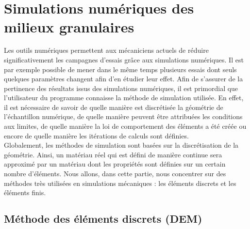 \section{Simulations numériques des milieux granulaires}\label{para:methodes_simu}
	Les outils numériques permettent aux mécaniciens actuels de réduire significativement les campagnes d'essais grâce aux simulations numériques. Il est par exemple possible de mener dans le même temps plusieurs essais dont seuls quelques paramètres changent afin d'en étudier leur effet. Afin de s'assurer de la pertinence des résultats issus des simulations numériques, il est primordial que l'utilisateur du programme connaisse la méthode de simulation utilisée. En effet, il est nécessaire de savoir de quelle manière est discrétisée la géométrie de l'échantillon numérique, de quelle manière peuvent être attribuées les conditions aux limites, de quelle manière la loi de comportement des éléments a été créée ou encore de quelle manière les itérations de calculs sont définies.
	\\Globalement, les méthodes de simulation sont basées sur la discrétisation de la géométrie. Ainsi, un matériau réel qui est défini de manière continue sera approximé par un matériau dont les propriétés sont définies sur un certain nombre d'éléments. Nous allons, dans cette partie, nous concentrer sur des méthodes très utilisées en simulations mécaniques : les éléments discrets et les éléments finis.
	\subsection{Méthode des éléments discrets (DEM)}
